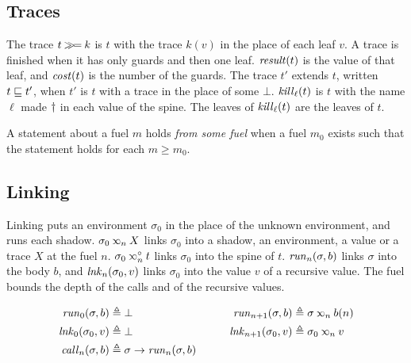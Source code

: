 \subsection{Traces}

The trace $t\mathbin{\gg\!=} k$ is $t$ with the trace $k(v)$ in the place of each leaf $v$.
A trace is finished when it has only guards and then one leaf.
$\mathit{result}(t)$ is the value of that leaf, and $\mathit{cost}(t)$ is the number of the guards.
The trace $t'$ extends $t$, written $t\sqsubseteq t'$, when $t'$ is $t$ with a trace in the place of some $\bot$.
$\mathit{kill}_{\ell}(t)$ is $t$ with the name $\ell$ made $\dagger$ in each value of the spine.
The leaves of $\mathit{kill}_{\ell}(t)$ are the leaves of $t$.

A statement about a fuel $m$ holds \emph{from some fuel} when a fuel $m_0$ exists such that the statement holds for each $m\ge m_0$.

\subsection{Linking}

Linking puts an environment $\sigma_0$ in the place of the unknown environment, and runs each shadow.
$\sigma_0\lk{n}X$ links $\sigma_0$ into a shadow, an environment, a value or a trace $X$ at the fuel $n$.
$\sigma_0\splk{n}t$ links $\sigma_0$ into the spine of $t$.
$\mathit{run}_{n}(\sigma,b)$ links $\sigma$ into the body $b$, and $\mathit{lnk}_{n}(\sigma_0,v)$ links $\sigma_0$ into the value $v$ of a recursive value.
The fuel bounds the depth of the calls and of the recursive values.

\begin{alignat*}{2}
  \runb{0}(\sigma,b)       & \triangleq\bot   & \qquad \runb{n+1}(\sigma,b)     & \triangleq\sigma\lk{n}b(n)  \\
  \lnkv{0}(\sigma_0,v)     & \triangleq\bot   & \qquad \lnkv{n+1}(\sigma_0,v)   & \triangleq\sigma_0\lk{n}v   \\
  \callt{n}(\sigma,b)      & \triangleq\guardt{\sigma}{\runb{n}(\sigma,b)}
\end{alignat*}

